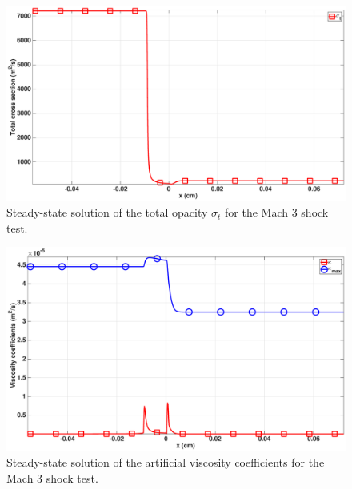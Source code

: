 \documentclass[times,doublespace]{fldauth}%
\begin{document}
%
\begin{figure}[H]
    \centering
    \includegraphics[width=\textwidth]{figures/dpt-xs/mach_3_nel_1000_total_cross_section.eps}
    \caption{Steady-state solution of the total opacity $\sigma_t$ for the Mach 3 shock test.}\label{fig:mach-3-dpt-xs-visc}
\end{figure}
%
\begin{figure}[H]
    \centering
    \includegraphics[width=\textwidth]{figures/dpt-xs/mach_3_nel_1000_viscosity.eps}
    \caption{Steady-state solution of the artificial viscosity coefficients for the Mach 3 shock test.}\label{fig:mach-3-dpt-xs-visc}
\end{figure}
%
\end{document}
